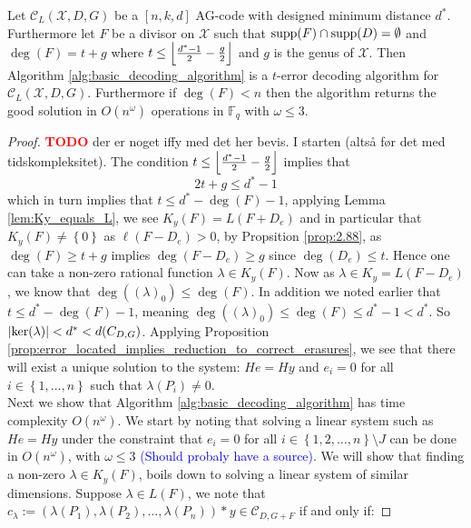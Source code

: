\begin{theorem}\label{thm:basic_decoding_algorithm_works}
  Let $\mathcal{C}_{L}(\mathcal{X}, D, G)$ be a $[n, k, d]$ AG-code with designed minimum distance $d^{*}$. Furthermore let $F$ be a divisor on $\mathcal{X}$ such that $\textnormal{supp}(F) \cap \textnormal{supp}(D) = \emptyset$ and $\deg(F) = t + g$ where $t \leq \left\lfloor\frac{d^{*} - 1}{2} - \frac{g}{2}\right\rfloor$ and $g$ is the genus of $\mathcal{X}$. Then Algorithm \ref{alg:basic_decoding_algorithm} is a $t$-error decoding algorithm for $\mathcal{C}_{L}(\mathcal{X}, D, G)$. Furthermore if $\deg(F) < n$ then the algorithm returns the good solution in $O(n^{\omega})$ operations in $\mathbb{F}_q$ with $\omega \leq 3$.
\end{theorem}
\begin{proof}
  \textcolor{red}{\textbf{TODO}} der er noget iffy med det her bevis. I starten (altså før det med tidskompleksitet).
  The condition $t \leq \left\lfloor\frac{d^{*} - 1}{2} - \frac{g}{2}\right\rfloor$ implies that
  \begin{equation*}
    2t + g \leq d^{*} - 1
  \end{equation*}
  which in turn implies that $t \leq d^{*} - \deg(F) - 1$, applying Lemma \ref{lem:Ky_equals_L}, we see $K_y(F) = L(F + D_e)$ and in particular that $K_y(F) \neq \left\{0\right\}$ as $\ell(F - D_e) > 0$, by Propsition \ref{prop:2.88}, as $\deg(F) \geq t + g$ implies $\deg(F - D_e) \geq g$ since $\deg(D_e) \leq t$. Hence one can take a non-zero rational function $\lambda \in K_y(F)$. Now as $\lambda \in K_{y} = L(F - D_e)$, we know that $\deg( (\lambda)_{0} ) \leq \deg(F)$. In addition we noted earlier that $t \leq d^{*} - \deg(F) - 1$, meaning $\deg((\lambda)_{0}) \leq \deg(F) \leq d^{*} - 1 < d^{*}$. So $\left\lvert\ker(\lambda)\right\rvert < d^{*} < d(C_{D, G})$. Applying Proposition \ref{prop:error_located_implies_reduction_to_correct_erasures}, we see that there will exist a unique solution to the system: $He = Hy$ and $e_{i} = 0$ for all $i \in \left\{1, \ldots, n\right\}$ such that $\lambda(P_i) \neq 0$. \\
  Next we show that Algorithm \ref{alg:basic_decoding_algorithm} has time complexity $O(n^{\omega})$. We start by noting that solving a linear system such as $He = Hy$ under the constraint that $e_i = 0$ for all $i \in \left\{1, 2, \ldots, n\right\} \setminus J$ can be done in $O(n^{\omega})$, with $\omega \leq 3$ \textcolor{blue}{(Should probaly have a source)}. We will show that finding a non-zero $\lambda \in K_y(F)$, boils down to solving a linear system of similar dimensions. Suppose $\lambda \in L(F)$, we note that $c_\lambda := (\lambda(P_1), \lambda(P_2), \ldots, \lambda(P_n)) * y \in \mathcal{C}_{D, G + F}$ if and only if:

\end{proof}
